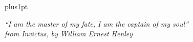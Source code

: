 \documentclass[twoside,11pt]{Latex/Classes/PhDthesisPSnPDF}
\begin{document}
\newpage



\hfuzz=50pt






\renewcommand\baselinestretch{1.2}
\baselineskip=18pt plus1pt



\begin{center}
\textit{``I am the master of my fate, I am the captain of my soul'' \\ from {\em Invictus}, by William Ernest Henley}
\end{center}


\newpage
%
%
%
%








%   
\end{document}
